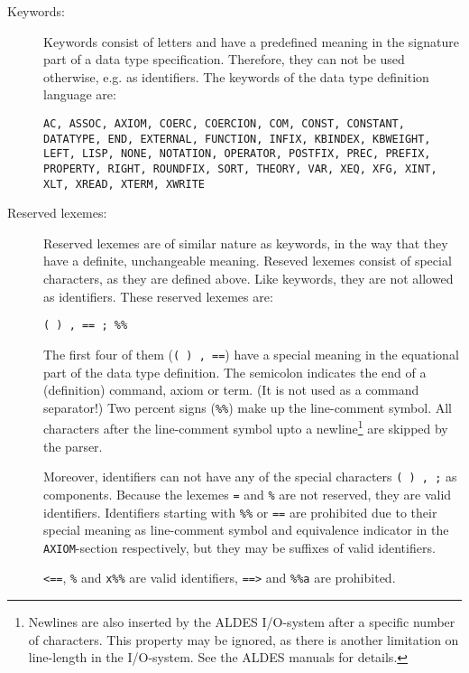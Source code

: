 \begin{description}
\item[Keywords:]
Keywords consist of letters and have a predefined meaning
in the signature part of a data type specification. Therefore, they can not
be used otherwise, e.g. as identifiers. 
The keywords of the data type definition language are:
\begin{flushleft}
{\tt AC, ASSOC, AXIOM, COERC, COERCION, COM, CONST,
CONSTANT, DATATYPE, END, EXTERNAL, FUNCTION, INFIX,
KBINDEX, KBWEIGHT, LEFT, LISP, NONE, NOTATION, OPERATOR,
POSTFIX, PREC, PREFIX, PROPERTY, RIGHT, ROUNDFIX,
SORT, THEORY, VAR, XEQ, XFG, XINT, XLT, XREAD, XTERM, XWRITE}
\end{flushleft}

\item[Reserved lexemes:]
Reserved lexemes are of similar nature as keywords, in the way that they
have a definite, unchangeable meaning. Reseved lexemes consist of special characters,
as they are defined above. Like keywords, they are not allowed as identifiers.
These reserved lexemes are:

{\tt\verb|( ) , == ; %%|}

The first four of them ({\tt\verb|( ) , ==|}) have a special meaning in the
equational part of the data type definition.
The semicolon indicates the end of a (definition) command, axiom or term.
(It is not used as a command separator!)
Two percent signs ({\tt\verb|%%|}) make up the line-comment symbol.
All characters after the line-comment symbol upto a newline\footnote{Newlines
are also inserted by the ALDES I/O-system after a specific number
of characters. This property may be ignored, as there is another limitation
on line-length in the I/O-system. See the ALDES manuals for details.}
are skipped by the parser.

Moreover, identifiers can not have any of the special characters
{\tt\verb|( ) , ;|} as components. Because the lexemes {\tt =} and {\tt \%}
are not reserved, they are valid identifiers. Identifiers starting with
{\tt \%\%} or {\tt ==} are prohibited due to their special meaning as 
line-comment
symbol and equivalence indicator in the {\tt AXIOM}-section respectively, but
they may be suffixes of valid identifiers.

\begin{example}
{\rm {\tt <==}, {\tt\verb|%|} and {\tt\verb|x%%|} are valid identifiers,
{\tt ==>} and {\tt\verb|%%a|} are prohibited.}
\end{example}


\end{description}
